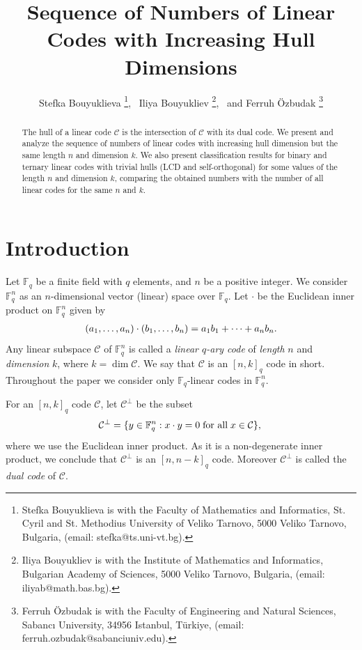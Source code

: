 \documentclass[a4paper,11pt]{article}
\newcommand{\F}{\mathbb{F}}
\newcommand{\be}{\begin{eqnarray}}
\newcommand{\ee}{\end{eqnarray}}
\newcommand{\nn}{{\nonumber}}
\begin{document}
\date{}
\title{Sequence of Numbers of Linear Codes with Increasing Hull Dimensions}
\author{Stefka Bouyuklieva \thanks{Stefka Bouyuklieva is with the Faculty of Mathematics and Informatics, St. Cyril and St. Methodius University of Veliko Tarnovo, 5000
Veliko Tarnovo, Bulgaria, (email: stefka@ts.uni-vt.bg).},~
Iliya Bouyukliev \thanks{Iliya Bouyukliev is with the Institute of Mathematics and Informatics, Bulgarian Academy of Sciences, 5000 Veliko Tarnovo, Bulgaria, (email: iliyab@math.bas.bg).},~
and Ferruh \"{O}zbudak \thanks{Ferruh \"{O}zbudak is with the Faculty of Engineering and Natural Sciences, Sabanc{\i} University, 34956 Istanbul, T\"{u}rkiye, (email: ferruh.ozbudak@sabanciuniv.edu).} }
\maketitle



\begin{abstract}
The hull of a linear code $\mathcal{C}$ is the intersection of $\mathcal{C}$ with its dual code. We present and analyze the sequence of numbers of linear codes with increasing hull dimension but
the same length $n$ and dimension $k$. We also present classification results for binary and ternary linear codes with trivial hulls (LCD and self-orthogonal) for some values of the length $n$ and dimension $k$, comparing the obtained numbers with the number of all linear codes for the same $n$ and $k$.
\end{abstract}

\section{Introduction}
\label{intro}

Let $\F_q$ be a finite field with $q$ elements, and $n$ be a positive integer.
We consider $\F_q^n$ as an $n$-dimensional vector (linear) space over $\F_q$.
Let $\cdot$ be the Euclidean inner product on $\F_q^n$ given by
\be
(a_1, \ldots, a_n) \cdot (b_1,\ldots, b_n) =a_1b_1 + \cdots + a_nb_n.
\nn\ee
Any linear subspace $\mathcal{C}$ of $\F_q^n$ is called a {\it linear $q$-ary code} of {\it length} $n$ and {\it dimension} $k$, where $k=\dim \mathcal{C}$.
We say that $\mathcal{C}$ is an $[n,k]_q$ code in short. Throughout the paper we consider only $\F_q$-linear codes in $\F_q^n$.

For an $[n,k]_q$ code $\mathcal{C}$, let $\mathcal{C}^\perp$ be the subset
\be
\mathcal{C}^\perp=\{y \in \F_q^n: x \cdot y=0 \; \mbox{for all} \; x \in \mathcal{C}\},
\nn\ee
where we use the Euclidean inner product. As it is a non-degenerate inner product, we conclude that $\mathcal{C}^\perp$ is an $[n,n-k]_q$ code. Moreover $\mathcal{C}^\perp$ is called the {\it dual code} of $\mathcal{C}$.
\end{document}
